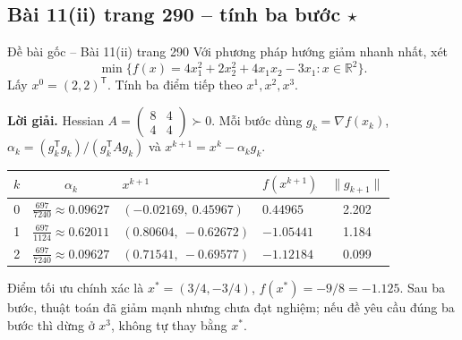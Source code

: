 \documentclass[11pt,a4paper]{article}
\newcommand{\R}{\mathbb{R}}
\newcommand{\grad}{\nabla}
\newcommand{\T}{^{\mathsf T}}
\begin{document}
\subsection{Bài 11(ii) trang 290 -- tính ba bước \(\star\)}
\begin{questionbox}{Đề bài gốc -- Bài 11(ii) trang 290}
Với phương pháp hướng giảm nhanh nhất, xét
\[
\min\{f(x)=4x_1^2+2x_2^2+4x_1x_2-3x_1:x\in\R^2\}.
\]
Lấy \(x^0=(2,2)\T\). Tính ba điểm tiếp theo \(x^1,x^2,x^3\).
\end{questionbox}
\textbf{Lời giải.} Hessian \(A=\begin{pmatrix}8&4\\4&4\end{pmatrix}\succ0\). Mỗi bước dùng \(g_k=\grad f(x_k)\), \(\alpha_k=(g_k\T g_k)/(g_k\T Ag_k)\) và \(x^{k+1}=x^k-\alpha_kg_k\).
\begin{center}
\begin{tabularx}{.96\textwidth}{c c Y Y c}
\toprule
\(k\) & \(\alpha_k\) & \(x^{k+1}\) & \(f(x^{k+1})\) & \(\|g_{k+1}\|\)\\
 & \(\frac{697}{7240}\approx0.09627\) & \((-0.02169,\ 0.45967)\) & \(0.44965\) & 2.202\\
1 & \(\frac{697}{1124}\approx0.62011\) & \((0.80604,\ -0.62672)\) & \(-1.05441\) & 1.184\\
2 & \(\frac{697}{7240}\approx0.09627\) & \((0.71541,\ -0.69577)\) & \(-1.12184\) & 0.099\\
\bottomrule
\end{tabularx}
\end{center}
Điểm tối ưu chính xác là \(x^\ast=(3/4,-3/4)\), \(f(x^\ast)=-9/8=-1.125\). Sau ba bước, thuật toán đã giảm mạnh nhưng chưa đạt nghiệm; nếu đề yêu cầu đúng ba bước thì dừng ở \(x^3\), không tự thay bằng \(x^\ast\).

\clearpage
\end{document}
